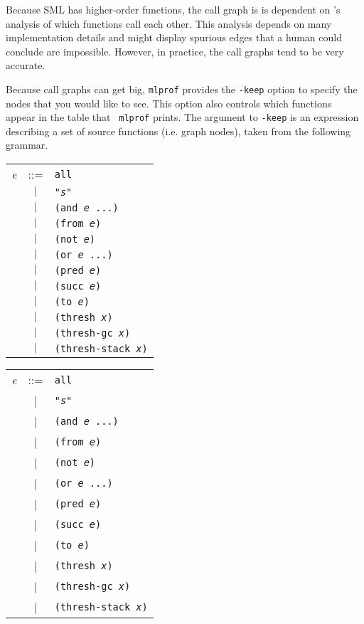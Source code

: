 Because SML has higher-order functions, the call graph is is dependent
on {\mlton}'s analysis of which functions call each other.  This
analysis depends on many implementation details and might display
spurious edges that a human could conclude are impossible.  However,
in practice, the call graphs tend to be very accurate.

Because call graphs can get big, {\tt mlprof} provides the {\tt -keep}
option to specify the nodes that you would like to see.  This
option also controls which functions appear in the table that {\tt
mlprof} prints.  The argument to {\tt -keep} is an expression
describing a set of source functions (i.e. graph nodes), taken from
the following grammar.

\begin{latexonly}
\begin{center}
\begin{tabular}{lcl}
{\it e} & ::= & {\tt all} \\
& $\ |\ $ & {\tt "{\it s}"} \\
& $\ |\ $ & {\tt (and {\it e} ...)} \\
& $\ |\ $ & {\tt (from {\it e})} \\
& $\ |\ $ & {\tt (not {\it e})} \\
& $\ |\ $ & {\tt (or {\it e} ...)} \\
& $\ |\ $ & {\tt (pred {\it e})} \\
& $\ |\ $ & {\tt (succ {\it e})} \\
& $\ |\ $ & {\tt (to {\it e})} \\
& $\ |\ $ & {\tt (thresh {\it x})} \\
& $\ |\ $ & {\tt (thresh-gc {\it x})} \\
& $\ |\ $ & {\tt (thresh-stack {\it x})} \\
\end{tabular}
\end{center}
\end{latexonly}
\begin{htmlonly}
\begin{center}
\begin{tabular}{lcl}
{\it e} & ::= & {\tt all} \\
& | & {\tt "{\it s}"} \\
& | & {\tt (and {\it e} ...)} \\
& | & {\tt (from {\it e})} \\
& | & {\tt (not {\it e})} \\
& | & {\tt (or {\it e} ...)} \\
& | & {\tt (pred {\it e})} \\
& | & {\tt (succ {\it e})} \\
& | & {\tt (to {\it e})} \\
& | & {\tt (thresh {\it x})} \\
& | & {\tt (thresh-gc {\it x})} \\
& | & {\tt (thresh-stack {\it x})} \\
\end{tabular}
\end{center}
\end{htmlonly}

